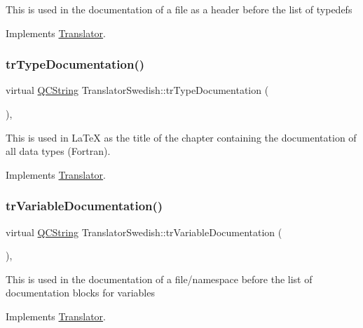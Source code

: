 This is used in the documentation of a file as a header before the list of typedefs 

Implements \mbox{\hyperlink{class_translator}{Translator}}.

\mbox{\label{class_translator_swedish_a514ba03279c99aaafe2c0e898f0ca6af}} 
\subsubsection{\texorpdfstring{trTypeDocumentation()}{trTypeDocumentation()}}
{\footnotesize\ttfamily virtual \mbox{\hyperlink{class_q_c_string}{Q\+C\+String}} Translator\+Swedish\+::tr\+Type\+Documentation (\begin{DoxyParamCaption}{ }\end{DoxyParamCaption})\hspace{0.3cm}{\ttfamily [inline]}, {\ttfamily [virtual]}}

This is used in La\+TeX as the title of the chapter containing the documentation of all data types (Fortran). 

Implements \mbox{\hyperlink{class_translator}{Translator}}.

\mbox{\label{class_translator_swedish_aeaaf52241c6aacbda48a523ead89bc55}} 
\subsubsection{\texorpdfstring{trVariableDocumentation()}{trVariableDocumentation()}}
{\footnotesize\ttfamily virtual \mbox{\hyperlink{class_q_c_string}{Q\+C\+String}} Translator\+Swedish\+::tr\+Variable\+Documentation (\begin{DoxyParamCaption}{ }\end{DoxyParamCaption})\hspace{0.3cm}{\ttfamily [inline]}, {\ttfamily [virtual]}}

This is used in the documentation of a file/namespace before the list of documentation blocks for variables 

Implements \mbox{\hyperlink{class_translator}{Translator}}.

